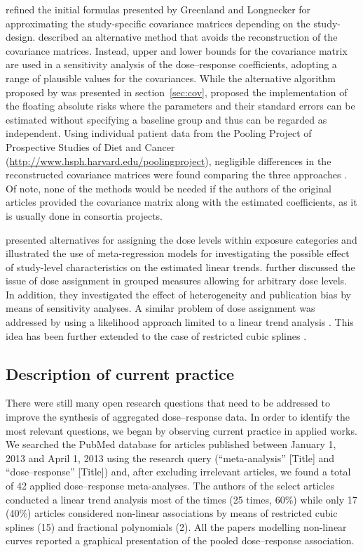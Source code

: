 \documentclass[11pt,a4paper,twoside,openany]{book}\usepackage{knitr}
\begin{document}
{{\cite{orsini2006generalized} refined the initial formulas presented by Greenland and Longnecker for approximating the study-specific covariance matrices depending on the study-design. \cite{berrington2003generalized} described an alternative method that avoids the reconstruction of the covariance matrices. Instead, upper and lower bounds for the covariance matrix are used in a sensitivity analysis of the dose--response coefficients, adopting a range of plausible values for the covariances. While the alternative algorithm proposed by \cite{hamling2008facilitating} was presented in section~\ref{sec:cov}, \cite{easton1991floating} proposed the implementation of the floating absolute risks where the parameters and their standard errors can be estimated without specifying a baseline group and thus can be regarded as independent. Using individual patient data from the Pooling Project of Prospective Studies of Diet and Cancer (\url{http://www.hsph.harvard.edu/poolingproject}), negligible differences in the reconstructed covariance matrices were found comparing the three approaches \citep{orsini2011meta}. Of note, none of the methods would be needed if the authors of the original articles provided the covariance matrix along with the estimated coefficients, as it is usually done in consortia projects.

\cite{berlin1993meta} presented alternatives for assigning the dose levels within exposure categories and illustrated the use of meta-regression models for investigating the possible effect of study-level characteristics on the estimated linear trends. \cite{shi2004meta} further discussed the issue of dose assignment in grouped measures allowing for arbitrary dose levels. In addition, they investigated the effect of heterogeneity and publication bias by means of sensitivity analyses. A similar problem of dose assignment was addressed by using a likelihood approach limited to a linear trend analysis \citep{takahashi2010assignment}. This idea has been further extended to the case of restricted cubic splines \citep{takahashi2013cubic}.

\subsection{Description of current practice}

There were still many open research questions that need to be addressed to improve the synthesis of aggregated dose--response data. In order to identify the most relevant questions, we began by observing current practice in applied works.
We searched the PubMed database for articles published between January 1, 2013 and April 1, 2013 using the research query (``meta-analysis'' [Title] and ``dose--response'' [Title]) and, after excluding irrelevant articles, we found a total of 42 applied dose--response meta-analyses. The authors of the select articles conducted a linear trend analysis most of the times (25 times, 60\%) while only 17 (40\%) articles considered non-linear associations by means of restricted cubic splines (15) and fractional polynomials (2). All the papers modelling non-linear curves reported a graphical presentation of the pooled dose--response association.

}}
\end{document}
